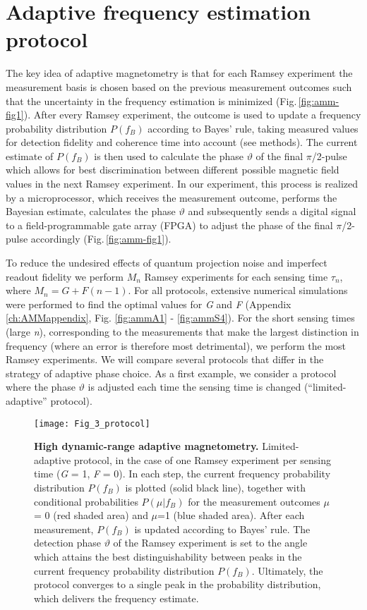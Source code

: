 \section{Adaptive frequency estimation protocol}
The key idea of adaptive magnetometry is that for each Ramsey experiment the measurement basis is chosen based on the previous measurement outcomes such that the uncertainty in the frequency estimation is minimized (Fig.\,\ref{fig:amm-fig1}). After every Ramsey experiment, the outcome is used to update a frequency probability distribution $P(f_B)$ according to Bayes’ rule, taking measured values for detection fidelity and coherence time into account (see methods). The current estimate of $P(f_B)$ is then used to calculate the phase $\vartheta$ of the final $\pi$/2-pulse which allows for best discrimination between different possible magnetic field values in the next Ramsey experiment\cite{Cappellaro_Phys.Rev.A_2012}. In our experiment, this process is realized by a microprocessor, which receives the measurement outcome, performs the Bayesian estimate, calculates the  phase $\vartheta$ and subsequently sends a digital signal to a field-programmable gate array (FPGA) to adjust the phase of the final $\pi$/2-pulse accordingly (Fig.\,\ref{fig:amm-fig1}).

To reduce the undesired effects of quantum projection noise and imperfect readout fidelity we perform $M_n$ Ramsey experiments\cite{Said_Phys.Rev.B_2011} for each sensing time $\tau_n$, where  $M_n = G + F (n-1)$. For all protocols, extensive numerical simulations were performed to find the optimal values for \textit{G} and \textit{F} (Appendix \ref{ch:AMMappendix}, Fig. \ref{fig:ammA1} - \ref{fig:ammS4}). For the short sensing times (large \textit{n}), corresponding to the measurements that make the largest distinction in frequency (where an error is therefore most detrimental), we  perform the most Ramsey experiments. We will compare several protocols that differ in the strategy of adaptive phase choice. As a first example, we consider a protocol where the phase $\vartheta$ is adjusted each time the sensing time is changed (“limited-adaptive” protocol). 

\begin{figure*}
	\centering
	\texttt{[image: Fig\_3\_protocol]}
	\caption{\label{fig:amm-fig3} \textbf{High dynamic-range adaptive magnetometry.} Limited-adaptive protocol, in the case of one Ramsey experiment per sensing time (\textit{G} = 1, \textit{F} = 0). In each step, the current frequency probability distribution $P(f_B)$ is plotted (solid black line), together with conditional probabilities $P(\mu|f_B)$ for the measurement outcomes $\mu$ = 0 (red shaded area) and $\mu$=1 (blue shaded area). After each measurement,  $P(f_B)$ is updated according to Bayes’ rule. The detection phase $\vartheta$ of the Ramsey experiment is set to the angle which attains the best distinguishability between peaks in the current frequency probability distribution $P(f_B)$. Ultimately, the protocol converges to a single peak in the probability distribution, which delivers the frequency estimate.}
\end{figure*}

